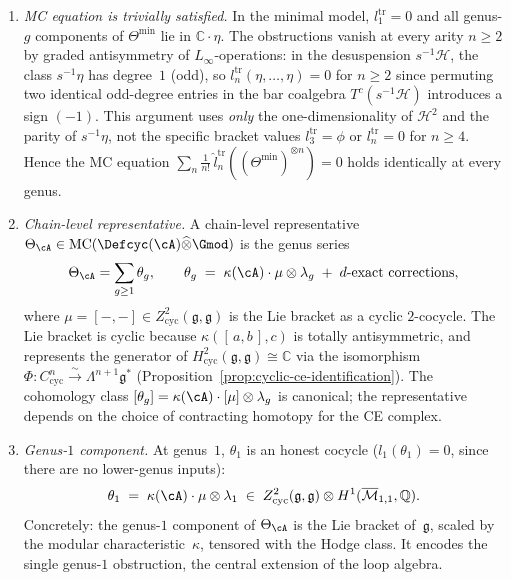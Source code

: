 \begin{theorem}
\begin{enumerate}[label=\textup{(\alph*)}]
\item \emph{MC equation is trivially satisfied.}
  In the minimal model, $l_1^{\mathrm{tr}} = 0$ and all genus-$g$
  components of $\Theta^{\min}$ lie in $\mathbb{C}\!\cdot\!\eta$.
  The obstructions vanish at every arity $n \geq 2$ by
  graded antisymmetry of $L_\infty$-operations: in the
  desuspension $s^{-1}\mathcal{H}$, the class
  $s^{-1}\eta$ has degree~$1$ \textup{(}odd\textup{)}, so
  $l_n^{\mathrm{tr}}(\eta, \ldots, \eta) = 0$ for $n \geq 2$
  since permuting two identical odd-degree entries
  in the bar coalgebra $T^c(s^{-1}\mathcal{H})$ introduces
  a sign $(-1)$.
  This argument uses \emph{only} the one-dimensionality
  of $\mathcal{H}^2$ and the parity of $s^{-1}\eta$, not the
  specific bracket values $l_3^{\mathrm{tr}} = \phi$ or
  $l_n^{\mathrm{tr}} = 0$ for $n \geq 4$.
  Hence the MC equation $\sum_n \frac{1}{n!}\,
  \hat{l}_n^{\mathrm{tr}}((\Theta^{\min})^{\otimes n}) = 0$
  holds identically at every genus.

\item \emph{Chain-level representative.}
  A chain-level representative
  $\Theta_{\cA} \in
  \operatorname{MC}(\Defcyc(\cA)\widehat{\otimes}\Gmod)$
  is the genus series
  \begin{equation}\label{eq:theta-chain}
  \Theta_{\cA} = \sum_{g \geq 1} \theta_g,
  \qquad
  \theta_g \;=\; \kappa(\cA) \cdot \mu \otimes \lambda_g
  \;+\; d\text{-exact corrections},
  \end{equation}
  where $\mu = [-,-] \in Z^2_{\mathrm{cyc}}(\mathfrak{g},
  \mathfrak{g})$ is the Lie bracket as a cyclic $2$-cocycle.
  The Lie bracket is cyclic because
  $\kappa([\,a,b\,],c)$ is totally antisymmetric, and
  represents the generator of
  $H^2_{\mathrm{cyc}}(\mathfrak{g},\mathfrak{g}) \cong
  \mathbb{C}$ via the isomorphism
  $\Phi \colon C^n_{\mathrm{cyc}} \xrightarrow{\sim}
  \Lambda^{n+1}\mathfrak{g}^*$
  \textup{(}Proposition~\textup{\ref{prop:cyclic-ce-identification}}\textup{)}.
  The cohomology class $[\theta_g] =
  \kappa(\cA)\cdot[\mu]\otimes\lambda_g$ is canonical;
  the representative depends on the choice of contracting homotopy
  for the CE complex.

\item \emph{Genus-$1$ component.}
  At genus~$1$, $\theta_1$ is an honest cocycle
  \textup{(}$l_1(\theta_1) = 0$, since there are no lower-genus
  inputs\textup{)}:
  \begin{equation}\label{eq:theta-genus1}
  \theta_1 \;=\; \kappa(\cA) \cdot \mu \otimes \lambda_1
  \;\in\;
  Z^2_{\mathrm{cyc}}(\mathfrak{g},\mathfrak{g})
  \otimes H^1(\overline{\mathcal{M}}_{1,1},\mathbb{Q}).
  \end{equation}
  Concretely: the genus-$1$ component of $\Theta_{\cA}$ is the
  Lie bracket of~$\mathfrak{g}$, scaled by the modular
  characteristic~$\kappa$, tensored with the Hodge class.
  It encodes the single genus-$1$ obstruction, the central
  extension of the loop algebra.


\end{enumerate}
\end{theorem}
